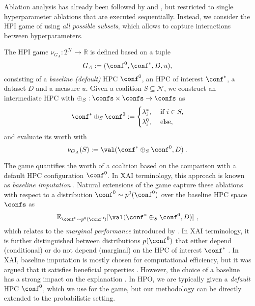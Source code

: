 Ablation analysis has already been followed by \citet{Fawcett-jh16a} and \citet{DBLP:conf/aaai/BiedenkappLEHFH17}, but restricted to single hyperparameter ablations that are executed sequentially.
Instead, we consider the HPI game of \ablation using \emph{all possible subsets}, which allows to capture interactions between hyperparameters.

\begin{definition}
The \ablation HPI game $\nu_{G_A}: 2^{\mathcal N} \to \mathbb{R}$ is defined based on a tuple 
\[ 
G_A := (\conf^0, \conf^\ast, D, u),
\]
consisting of a \emph{baseline (default)} HPC $\conf^0$,
an HPC of interest $\conf^\ast$, a dataset $D$ and a measure $u$.
Given a coalition $S\subseteq \mathcal{N}$, we construct an intermediate HPC with $\oplus_S: \confs \times \confs \to \confs$ as
\[
\conf^* \oplus_S \conf^0 := \begin{cases}
\lambda^\ast_i, & \text{ if } i \in S,\\
\lambda^0_i, & \text{ else},
\end{cases}
\]
and evaluate its worth with
\[
\nu_{G_A}(S) := \val(\conf^\ast \oplus_S \conf^0, D) \,\, .
\]
\end{definition}


The \ablation game quantifies the worth of a coalition based on the comparison with a default HPC configuration $\conf^0$.
In XAI terminology, this approach is known as \emph{baseline imputation} \citep{Fumagalli.2024a}.
Natural extensions of the \ablation game capture these ablations with respect to a distribution $\conf^0 \sim p^0(\conf^0)$ over the baseline HPC space $\confs$ as
\[
\mathbb{E}_{\conf^0 \sim p^0(\conf^0)}[ \val(\conf^\ast \oplus_S \conf^0, D)] \,\, ,
\]
which relates to the \emph{marginal performance} introduced by \citet{fANOVA}.
In XAI terminology, it is further distinguished between distributions $p(\conf^0)$ that either depend (conditional) or do not depend (marginal) on the HPC of interest $\conf^\ast$ \citep{Fumagalli.2024a}.
In XAI, baseline imputation is mostly chosen for computational efficiency, but it was argued that it satisfies beneficial properties \citep{Sundararajan.2020b}.
However, the choice of a baseline has a strong impact on the explanation \citep{sturmfels2020visualizing}.
In HPO, we are typically given a \emph{default} HPC $\conf^0$, which we use for the \ablation game, but our methodology can be directly extended to the probabilistic setting.


